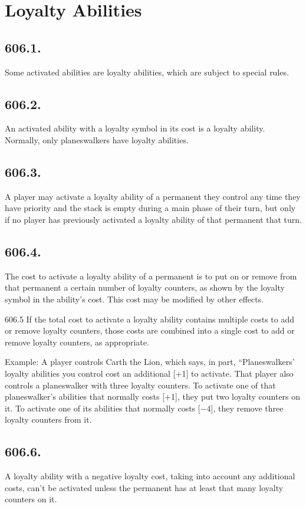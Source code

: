 \section{Loyalty Abilities}
\subsection*{606.1.}
Some activated abilities are loyalty abilities, which are subject to special rules.

\subsection*{606.2.}
An activated ability with a loyalty symbol in its cost is a loyalty ability. Normally, only planeswalkers have loyalty abilities.

\subsection*{606.3.}
A player may activate a loyalty ability of a permanent they control any time they have priority and the stack is empty during a main phase of their turn, but only if no player has previously activated a loyalty ability of that permanent that turn.

\subsection*{606.4.}
The cost to activate a loyalty ability of a permanent is to put on or remove from that permanent a certain number of loyalty counters, as shown by the loyalty symbol in the ability’s cost. This cost may be modified by other effects.

606.5 If the total cost to activate a loyalty ability contains multiple costs to add or remove loyalty counters, those costs are combined into a single cost to add or remove loyalty counters, as appropriate.

Example: A player controls Carth the Lion, which says, in part, “Planeswalkers’ loyalty abilities you control cost an additional [+1] to activate. That player also controls a planeswalker with three loyalty counters. To activate one of that planeswalker’s abilities that normally costs [+1], they put two loyalty counters on it. To activate one of its abilities that normally costs [−4], they remove three loyalty counters from it.

\subsection*{606.6.}
A loyalty ability with a negative loyalty cost, taking into account any additional costs, can’t be activated unless the permanent has at least that many loyalty counters on it.

